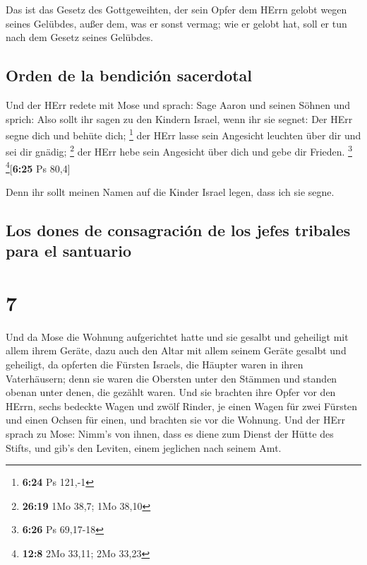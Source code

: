  Das ist das Gesetz des Gottgeweihten, der sein Opfer dem
HErrn gelobt wegen seines Gelübdes, außer dem, was er sonst vermag; wie
er gelobt hat, soll er tun nach dem Gesetz seines Gelübdes.

\hypertarget{orden-de-la-bendiciuxf3n-sacerdotal}{%
\subsection{Orden de la bendición
sacerdotal}\label{orden-de-la-bendiciuxf3n-sacerdotal}}

 Und der HErr redete mit Mose und sprach: 
Sage Aaron und seinen Söhnen und sprich: Also sollt ihr sagen zu den
Kindern Israel, wenn ihr sie segnet:  Der HErr segne dich
und behüte dich; \footnote{\textbf{6:24} Ps 121,-1}  der
HErr lasse sein Angesicht leuchten über dir und sei dir gnädig;
\footnote{\textbf{26:19} 1Mo 38,7; 1Mo 38,10}  der HErr
hebe sein Angesicht über dich und gebe dir Frieden. \footnote{\textbf{6:26}
  Ps 69,17-18} \footnote{\textbf{12:8} 2Mo 33,11; 2Mo 33,23}{[}\textbf{6:25}
Ps 80,4{]}

 Denn ihr sollt meinen Namen auf die Kinder Israel legen,
dass ich sie segne.

\hypertarget{los-dones-de-consagraciuxf3n-de-los-jefes-tribales-para-el-santuario}{%
\subsection{Los dones de consagración de los jefes tribales para el
santuario}\label{los-dones-de-consagraciuxf3n-de-los-jefes-tribales-para-el-santuario}}

\hypertarget{section-6}{%
\section{7}\label{section-6}}

 Und da Mose die Wohnung aufgerichtet hatte und sie
gesalbt und geheiligt mit allem ihrem Geräte, dazu auch den Altar mit
allem seinem Geräte gesalbt und geheiligt,  da opferten
die Fürsten Israels, die Häupter waren in ihren Vaterhäusern; denn sie
waren die Obersten unter den Stämmen und standen obenan unter denen, die
gezählt waren.  Und sie brachten ihre Opfer vor den HErrn,
sechs bedeckte Wagen und zwölf Rinder, je einen Wagen für zwei Fürsten
und einen Ochsen für einen, und brachten sie vor die Wohnung.
 Und der HErr sprach zu Mose:  Nimm's von
ihnen, dass es diene zum Dienst der Hütte des Stifts, und gib's den
Leviten, einem jeglichen nach seinem Amt.

